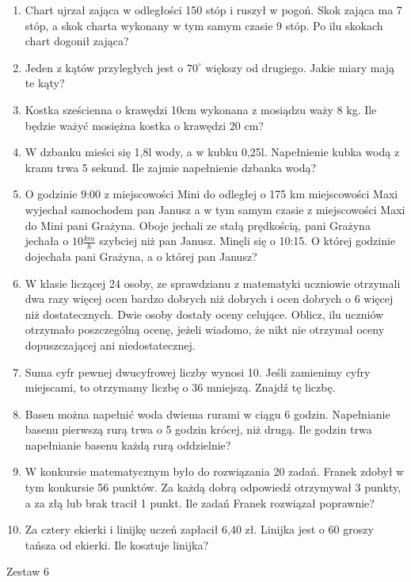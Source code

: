 \documentclass[12pt,a4paper]{article}
\begin{document}
\normalsize 
\begin{enumerate}[1.]
	\item Chart ujrzał zająca w odległości 150 stóp i ruszył w pogoń. Skok zająca ma 7 stóp, a skok charta wykonany w tym samym czasie 9 stóp. Po ilu skokach chart dogonił zająca?
	\item Jeden z kątów przyległych jest o $70^\circ$ większy od drugiego. Jakie miary mają te kąty?
	\item Kostka sześcienna o krawędzi 10cm wykonana z mosiądzu waży 8 kg. Ile będzie ważyć mosiężna kostka o krawędzi 20 cm?
	\item W dzbanku mieści się 1,8l wody, a w kubku 0,25l. Napełnienie kubka wodą z kranu trwa 5 sekund. Ile zajmie napełnienie dzbanka wodą?
	\item O godzinie 9:00 z miejscowości Mini do odległej o 175 km miejscowości Maxi wyjechał samochodem pan Janusz a w tym samym czasie z miejscowości Maxi do Mini pani Grażyna. Oboje jechali ze stałą prędkością, pani Grażyna jechała o $10\frac{km}{h}$ szybciej niż pan Janusz. Minęli się o 10:15. O której godzinie dojechała pani Grażyna, a o której pan Janusz?
	\item W klasie liczącej 24 osoby, ze sprawdzianu z matematyki uczniowie otrzymali dwa razy więcej ocen bardzo dobrych niż dobrych i ocen dobrych o 6 więcej niż dostatecznych. Dwie osoby dostały oceny celujące. Oblicz, ilu uczniów otrzymało poszczególną ocenę, jeżeli wiadomo, że nikt nie otrzymał oceny dopuszczającej ani niedostatecznej.
	\item Suma cyfr pewnej dwucyfrowej liczby wynosi 10. Jeśli zamienimy cyfry miejscami, to otrzymamy liczbę o 36 mniejszą. Znajdź tę liczbę.
	\item Basen można napełnić woda dwiema rurami w ciągu 6 godzin. Napełnianie
	basenu pierwszą rurą trwa o 5 godzin krócej, niż drugą. Ile godzin trwa napełnianie basenu każdą rurą oddzielnie?
	\item W konkursie matematycznym było do rozwiązania 20 zadań. Franek zdobył w tym konkursie 56 punktów. Za każdą dobrą odpowiedź otrzymywał 3 punkty, a za złą lub brak tracił 1 punkt. Ile zadań Franek rozwiązał poprawnie?
	\item Za cztery ekierki i linijkę uczeń zapłacił 6,40 zł. Linijka jest o 60 groszy tańsza od ekierki. Ile kosztuje linijka?
\end{enumerate}
\newpage
\LARGE \begin{center}
	Zestaw 6
\end{center}
\normalsize 
\end{document}
